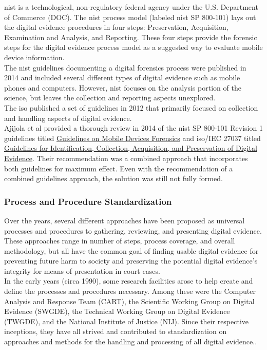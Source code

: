 \documentclass[12pt]{article}
\begin{document}
\gls{nist} is a technological, non-regulatory
federal agency under the U.S. Department of Commerce (DOC).  The \gls{nist} process model (labeled \gls{nist}
SP 800-101) lays out the digital evidence procedures in four steps: Preservation, Acquisition,
Examination and Analysis, and Reporting\cite{ajijola2014review}.  These four steps provide the
forensic steps for the digital evidence process model as a suggested way to evaluate mobile
device information.\\

The \gls{nist} guidelines\cite{ayers2014guidelines} documenting a digital forensics process were published
in 2014 and included several different types of digital evidence such as mobile phones and computers.
However, \gls{nist} focuses on the analysis portion of the science, but leaves the collection
and reporting aspects unexplored.\\

The \gls{iso} published a set of guidelines\cite{ISO27037}
in 2012 that primarily focused on collection and handling aspects of digital evidence.\\

Ajijola et al\cite{ajijola2014review} provided a thorough review in 2014 of the \gls{nist} SP
800-101 Revision 1 guidelines titled \uline{Guidelines on Mobile Devices Forensics} and
\gls{iso}/IEC 27037 titled \uline{Guidelines for Identification, Collection, Acquisition, and
Preservation of Digital Evidence}.  Their recommendation was a combined approach that 
incorporates both guidelines for maximum effect.  Even with the recommendation of a 
combined guidelines approach, the solution was still not fully formed.\\

\subsubsection{Process and Procedure Standardization}

Over the years, several different approaches have been proposed as universal processes and procedures to
gathering, reviewing, and presenting digital evidence.  These approaches range in number of
steps, process coverage, and overall methodology, 
but all have the common goal of finding usable digital evidence for preventing future
harm to society and preserving the potential digital evidence's 
integrity for means of presentation in court cases.\\

In the early years (circa 1990), some research facilities arose to help create and define the processes
and procedures necessary.  Among these were the Computer Analysis and
Response Team (CART), the Scientific Working Group on Digital Evidence (SWGDE), the
Technical Working Group on Digital Evidence (TWGDE), and the National Institute of
Justice (NIJ).  Since their respective inceptions, they have all strived and 
contributed to standardization on approaches and methods for 
the handling and processing of all digital evidence.\cite{noblett2000recovering}.\\
\end{document}
